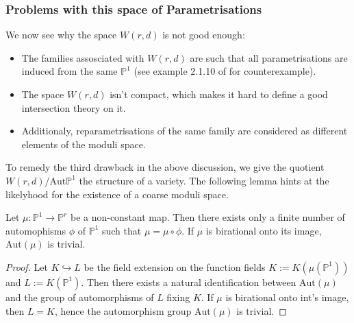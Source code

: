 %

\subsubsection{Problems with this space of Parametrisations}
We now see why the space $W(r,d)$ is not good enough:
\begin{itemize}
    \item The families assosciated with $W(r,d)$ are such that all parametrisations are induced from the same $\mathbb{P}^{1}$ (see example 2.1.10 of \cite{KockQcohom} for counterexample).
    \item The space $W(r,d)$ isn't compact, which makes it hard to define a good intersection theory on it.
    \item Additionaly, reparametrisations of the same family are considered as different elements of the moduli space.
\end{itemize}

\par To remedy the third drawback in the above discussion, we give the quotient $W(r,d)/\text{Aut}\mathbb{P}^{1}$ the structure of a variety.
The following lemma hints at the likelyhood for the existence of a coarse moduli space.

\begin{lemma}
    Let $\mu : \mathbb{P}^{1} \to \mathbb{P}^{r}$ be a non-constant map. 
    Then there exists only a finite number of automophisms $\phi$ of $\mathbb{P}^{1}$ such that $\mu = \mu \circ \phi$.
    If $\mu$ is birational onto its image, $\text{Aut}(\mu)$ is trivial.
\end{lemma}
\begin{proof}
    Let $K \hookrightarrow L$ be the field extension on the function fields $K:=K(\mu(\mathbb{P}^{1}))$ and $L:=K(\mathbb{P}^{1})$.
    Then there exists a natural identification between $\text{Aut}(\mu)$ and the group of automorphisms of $L$ fixing $K$.
    If $\mu$ is birational onto int's image, then $L = K$, hence the automorphism group $\text{Aut}(\mu)$ is trivial.
\end{proof}

